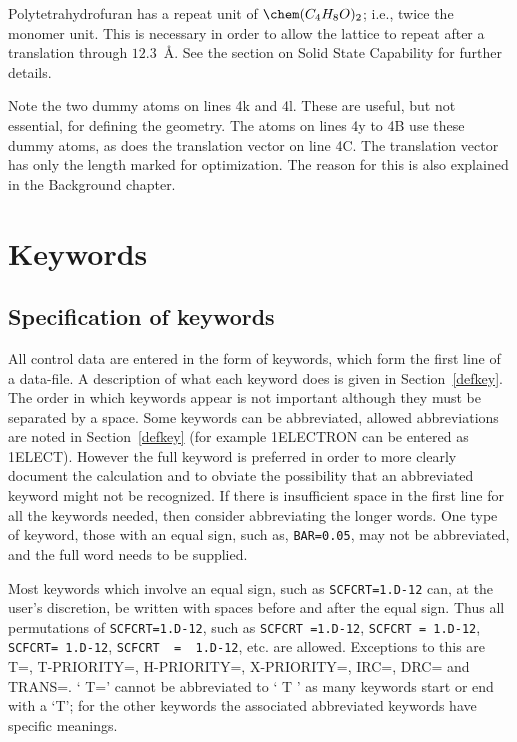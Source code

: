  Polytetrahydrofuran has a repeat unit of $\chem (C_4H_8O)_2$; i.e.,
 twice  the  monomer  unit.   This is necessary in order to allow the
 lattice to repeat after a translation through $12.3$~\AA.   See
 the section on Solid State Capability for further details.

      Note the two dummy atoms on lines 4k and 4l.  These are useful,
 but not essential, for defining the geometry.  The atoms on lines 4y
 to 4B use these dummy atoms, as does the translation vector on  line
 4C.    The  translation  vector  has  only  the  length  marked  for
 optimization.   The  reason  for  this  is  also  explained  in  the
 Background chapter.
\chapter{Keywords}
\section{Specification of keywords}
All control data are entered in the form of keywords, which form the
 first  line  of  a data-file.  A description of what each keyword does is
 given in Section~\ref{defkey}. The order in which keywords  appear is not
 important  although they must be separated by a space.  Some keywords can
 be abbreviated, allowed abbreviations are noted in Section~\ref{defkey} 
 (for
 example 1ELECTRON can be entered as 1ELECT).  However the full keyword is
 preferred in order to  more  clearly  document  the  calculation  and  to
 obviate  the  possibility  that  an  abbreviated  keyword  might  not  be
 recognized.  If there is insufficient space in the first line for all the
 keywords  needed,  then consider abbreviating the longer words.  One type
 of keyword, those with an equal sign, such as, \verb/BAR=0.05/,  may  not  be
 abbreviated, and the full word needs to be supplied.

 Most keywords which involve an equal sign, such as \verb/SCFCRT=1.D-12/
 can,  at  the  user's discretion, be written with spaces before and after
 the  equal  sign.   Thus  all  permutations  of  \verb/SCFCRT=1.D-12/,  
 such  as \verb/SCFCRT =1.D-12/, \verb/SCFCRT = 1.D-12/, 
 \verb/SCFCRT= 1.D-12/, \verb/SCFCRT  =  1.D-12/, etc.
 are allowed.   Exceptions  to  this  are  T=,  T-PRIORITY=,  H-PRIORITY=,
 X-PRIORITY=, IRC=, DRC= and TRANS=.  ` T=' cannot be abbreviated to ` T '
 as many keywords start or end with a `T';  for  the  other  keywords  the
 associated abbreviated keywords have specific meanings.

